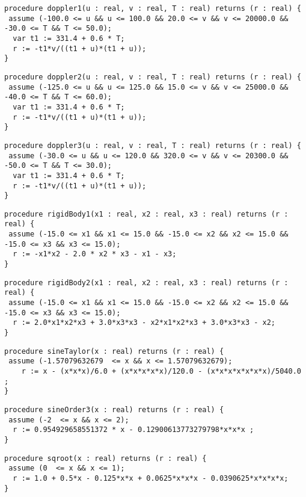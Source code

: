 \documentclass[a4paper,10pt]{article}
\theoremstyle{plain}
\theoremstyle{definition}
\theoremstyle{remark}
\begin{document}
{\scriptsize
\begin{lstlisting}
procedure doppler1(u : real, v : real, T : real) returns (r : real) {
 assume (-100.0 <= u && u <= 100.0 && 20.0 <= v && v <= 20000.0 && -30.0 <= T && T <= 50.0);
  var t1 := 331.4 + 0.6 * T;
  r := -t1*v/((t1 + u)*(t1 + u));
}
\end{lstlisting}
}
{\scriptsize
\begin{lstlisting}
procedure doppler2(u : real, v : real, T : real) returns (r : real) {
 assume (-125.0 <= u && u <= 125.0 && 15.0 <= v && v <= 25000.0 && -40.0 <= T && T <= 60.0);
  var t1 := 331.4 + 0.6 * T;
  r := -t1*v/((t1 + u)*(t1 + u));
}
\end{lstlisting}
}
{\scriptsize
\begin{lstlisting}
procedure doppler3(u : real, v : real, T : real) returns (r : real) {
 assume (-30.0 <= u && u <= 120.0 && 320.0 <= v && v <= 20300.0 && -50.0 <= T && T <= 30.0);
  var t1 := 331.4 + 0.6 * T;
  r := -t1*v/((t1 + u)*(t1 + u));
}
\end{lstlisting}
}
{\scriptsize
\begin{lstlisting}
procedure rigidBody1(x1 : real, x2 : real, x3 : real) returns (r : real) {
 assume (-15.0 <= x1 && x1 <= 15.0 && -15.0 <= x2 && x2 <= 15.0 && -15.0 <= x3 && x3 <= 15.0);
  r := -x1*x2 - 2.0 * x2 * x3 - x1 - x3;
}
\end{lstlisting}
}
{\scriptsize
\begin{lstlisting}
procedure rigidBody2(x1 : real, x2 : real, x3 : real) returns (r : real) {
 assume (-15.0 <= x1 && x1 <= 15.0 && -15.0 <= x2 && x2 <= 15.0 && -15.0 <= x3 && x3 <= 15.0);
  r := 2.0*x1*x2*x3 + 3.0*x3*x3 - x2*x1*x2*x3 + 3.0*x3*x3 - x2;
}
\end{lstlisting}
}
{\scriptsize
\begin{lstlisting}
procedure sineTaylor(x : real) returns (r : real) {
 assume (-1.57079632679  <= x && x <= 1.57079632679);
    r := x - (x*x*x)/6.0 + (x*x*x*x*x)/120.0 - (x*x*x*x*x*x*x)/5040.0 ;
}
\end{lstlisting}
}
{\scriptsize
\begin{lstlisting}
procedure sineOrder3(x : real) returns (r : real) {
 assume (-2  <= x && x <= 2);
  r := 0.954929658551372 * x - 0.12900613773279798*x*x*x ;
}
\end{lstlisting}
}
{\scriptsize
\begin{lstlisting}
procedure sqroot(x : real) returns (r : real) {
 assume (0  <= x && x <= 1);
  r := 1.0 + 0.5*x - 0.125*x*x + 0.0625*x*x*x - 0.0390625*x*x*x*x;
}
\end{lstlisting}
}
\end{document}
